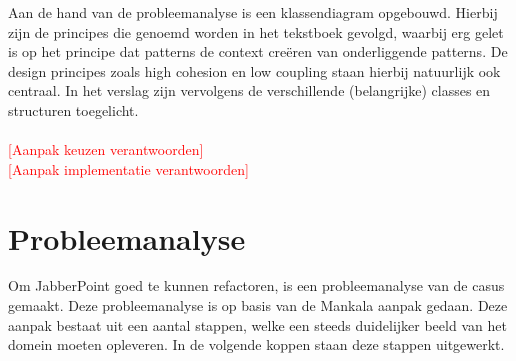 \documentclass[a4paper]{article}
\newcommand{\todo}[1]{\textcolor{red}{[#1]}}
\begin{document}
Aan de hand van de probleemanalyse is een klassendiagram opgebouwd. Hierbij zijn de principes die genoemd worden in het tekstboek gevolgd, waarbij erg gelet is op het principe dat patterns de context creëren van onderliggende patterns. De design principes zoals high cohesion en low coupling staan hierbij natuurlijk ook centraal. In het verslag zijn vervolgens de verschillende (belangrijke) classes en structuren toegelicht.
\\\\
\todo{Aanpak keuzen verantwoorden}
\\
\todo{Aanpak implementatie verantwoorden}


\section{Probleemanalyse}
Om JabberPoint goed te kunnen refactoren, is een probleemanalyse van de casus gemaakt. Deze probleemanalyse is op basis van de Mankala aanpak gedaan. Deze aanpak bestaat uit een aantal stappen, welke een steeds duidelijker beeld van het domein moeten opleveren. In de volgende koppen staan deze stappen uitgewerkt.
\end{document}
